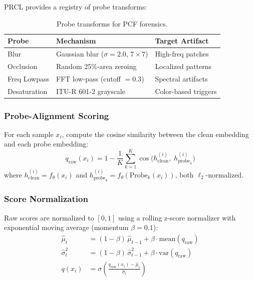 \documentclass[11pt,a4paper]{article}
\begin{document}
PRCL provides a registry of probe transforms:

\begin{table}[h]
\centering
\caption{Probe transforms for PCF forensics.}
\begin{tabular}{@{}lll@{}}
\toprule
\textbf{Probe} & \textbf{Mechanism} & \textbf{Target Artifact} \\
\midrule
Blur         & Gaussian blur ($\sigma\!=\!2.0$, $7\!\times\!7$) &
  High-freq patches \\
Occlusion    & Random 25\%-area zeroing &
  Localized patterns \\
Freq Lowpass & FFT low-pass (cutoff $=0.3$) &
  Spectral artifacts \\
Desaturation & ITU-R 601-2 grayscale &
  Color-based triggers \\
\bottomrule
\end{tabular}
\label{tab:probes}
\end{table}

\subsubsection{Probe-Alignment Scoring}

For each sample $x_i$, compute the cosine similarity between the clean embedding
and each probe embedding:
\begin{equation}
  q_{\text{raw}}(x_i) = 1 - \frac{1}{K}\sum_{k=1}^{K}
    \cos\!\bigl(h_{\text{clean}}^{(i)},\; h_{\text{probe}_k}^{(i)}\bigr)
  \label{eq:pcf}
\end{equation}
where $h_{\text{clean}}^{(i)}=f_\theta(x_i)$ and
$h_{\text{probe}_k}^{(i)}=f_\theta(\text{Probe}_k(x_i))$, both
$\ell_2$-normalized.

\subsubsection{Score Normalization}

Raw scores are normalized to $[0,1]$ using a rolling z-score normalizer with
exponential moving average (momentum $\beta=0.1$):
\begin{align}
  \hat{\mu}_t &= (1-\beta)\,\hat{\mu}_{t-1} + \beta\cdot\text{mean}(q_{\text{raw}})
  \label{eq:ema_mu} \\
  \hat{\sigma}_t^2 &= (1-\beta)\,\hat{\sigma}_{t-1}^2 + \beta\cdot\text{var}(q_{\text{raw}})
  \label{eq:ema_var} \\
  q(x_i) &= \sigma\!\left(\frac{q_{\text{raw}}(x_i)-\hat{\mu}_t}{\hat{\sigma}_t}\right)
  \label{eq:sigmoid_norm}
\end{align}
\end{document}

